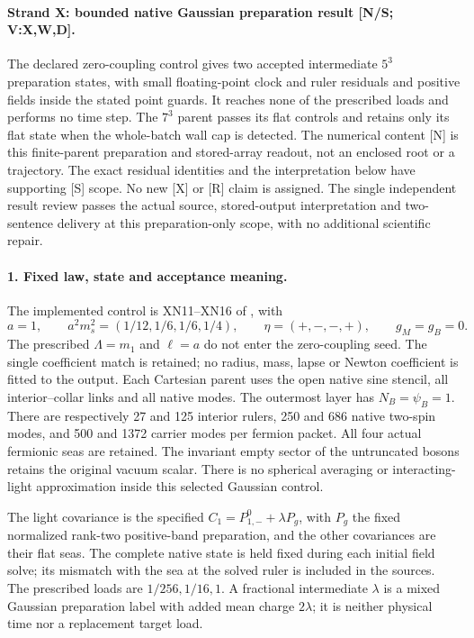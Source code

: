 \documentclass[11pt]{article}
\begin{document}
\paragraph{Strand X: bounded native Gaussian preparation result
[N/S; V:X,W,D].}
The declared zero-coupling control gives two accepted intermediate
$5^3$ preparation states, with small floating-point clock and ruler
residuals and positive fields inside the stated point guards.
It reaches none of the prescribed loads and performs no time step.
The $7^3$ parent passes its flat controls and retains only its flat
state when the whole-batch wall cap is detected.
The numerical content [N] is this finite-parent preparation and
stored-array readout, not an enclosed root or a trajectory.
The exact residual identities and the interpretation below have
supporting [S] scope.  No new [X] or [R] claim is assigned.
The single independent result review
 passes the actual source,
stored-output interpretation and two-sentence delivery at this
preparation-only scope, with no additional scientific repair.

\paragraph{1. Fixed law, state and acceptance meaning.}
The implemented control is XN11--XN16 of
, with
\[
 a=1,\qquad a^2m_s^2=(1/12,1/6,1/6,1/4),\qquad
 \eta=(+,-,-,+),\qquad g_M=g_B=0 .
\]
The prescribed $\Lambda=m_1$ and $\ell=a$ do not enter the
zero-coupling seed.  The single coefficient match is retained;
no radius, mass, lapse or Newton coefficient is fitted to the output.
Each Cartesian parent uses the open native sine stencil,
all interior--collar links and all native modes.  The outermost
layer has $N_B=\psi_B=1$.  There are respectively 27 and 125
interior rulers, 250 and 686 native two-spin modes, and 500 and
1372 carrier modes per fermion packet.
All four actual fermionic seas are retained.  The invariant empty
sector of the untruncated bosons retains the original vacuum scalar.
There is no spherical averaging or interacting-light approximation
inside this selected Gaussian control.

The light covariance is the specified
$C_1=P_{1,-}^{0}+\lambda P_g$, with $P_g$ the fixed normalized
rank-two positive-band preparation, and the other covariances are
their flat seas.  The complete native state is held fixed during
each initial field solve; its mismatch with the sea at the solved
ruler is included in the sources.  The prescribed loads are
$1/256,1/16,1$.  A fractional intermediate $\lambda$ is a mixed
Gaussian preparation label with added mean charge $2\lambda$;
it is neither physical time nor a replacement target load.
\end{document}
